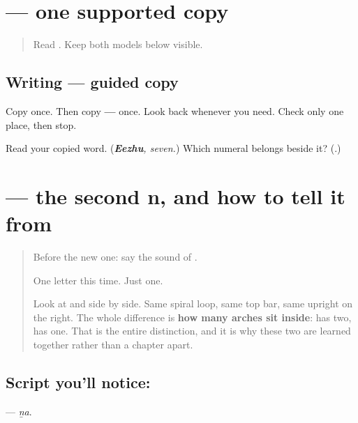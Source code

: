 \section[\texorpdfstring{\ta{௬} \ta{௭} \ta{௮} \ta{௯} \ta{௰} (six to ten)}{௬ ௭ ௮ ௯ ௰ (six to ten)}]{     — one supported copy}

\label{lesson:TA-W07-numbers-6-10-guided-copy}



\begin{quote}
Read \textbf{    }. Keep both models below visible.
\end{quote}

\subsection*{Writing — guided copy}
Copy \textbf{    } once. Then copy \textbf{ — } once. Look back whenever you need. Check only one place, then stop.

\begin{tcolorbox}[breakable,colback=teal!4,colframe=teal!35!black,title={Before you move on}]
Read your copied word. (\emph{\textbf{Eezhu}, seven.}) Which numeral belongs beside it? (\textbf{}.)
\end{tcolorbox}
\section[\texorpdfstring{\ta{ன} (ṉa)}{ன (ṉa)}]{ — the second n, and how to tell it from }

\label{lesson:TA-S03-nnna}



\begin{quote}
Before the new one: say the sound of \textbf{}.

One letter this time. Just one.

Look at  and  side by side. Same spiral loop, same top bar, same upright on the right. The whole difference is \textbf{how many arches sit inside}:  has two,  has one. That is the entire distinction, and it is why these two are learned together rather than a chapter apart.
\end{quote}

\subsection*{Script you'll notice: }
\textbf{} — \emph{ṉa}.

